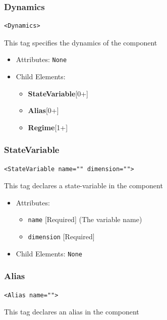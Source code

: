 \documentclass{article}
\newcommand{\StateVariable}{{\bf{StateVariable}}\xspace}
\newcommand{\Alias}{{\bf{Alias}}\xspace}
\newcommand{\Regime}{{\bf{Regime}}\xspace}
\begin{document}
\subsubsection{Dynamics}
%
\begin{lstlisting}
<Dynamics>
\end{lstlisting}

This tag specifies the dynamics of the component

\begin{itemize}
\item Attributes: \texttt{None}

\item Child Elements:
%
\begin{itemize}
\item \StateVariable {[}0+{]}
\item \Alias {[}0+{]}
\item \Regime {[}1+{]}
\end{itemize}

\end{itemize}

\subsubsection{StateVariable}
%
\begin{lstlisting}
<StateVariable name="" dimension="">
\end{lstlisting}

This tag declares a state-variable in the component

\begin{itemize}
\item Attributes:
%
\begin{itemize}
\item \verb|name| {[}Required{]} (The variable name)
\item \verb|dimension| {[}Required{]}
\end{itemize}

\item Child Elements: \texttt{None}
\end{itemize}

\subsubsection{Alias}
%
\begin{lstlisting}
<Alias name="">
\end{lstlisting}

This tag declares an alias in the component
\end{document}
